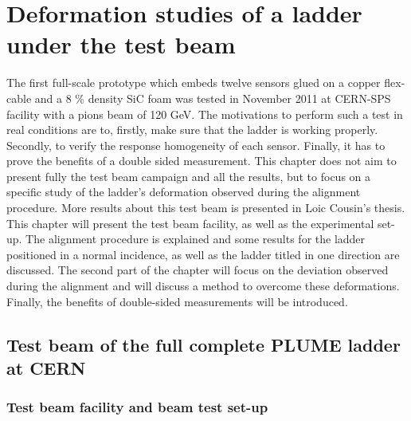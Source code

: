 \chapter{Deformation studies of a ladder under the test beam}

  The first full-scale prototype which embeds twelve sensors glued on a copper flex-cable and a 8 \% density \gls{SiC} foam was tested in November 2011 at CERN-SPS facility with a pions beam of 120 GeV.
  The motivations to perform such a test in real conditions are to, firstly, make sure that the ladder is working properly.
  Secondly, to verify the response homogeneity of each sensor.
  Finally, it has to prove the benefits of a double sided measurement.
  This chapter does not aim to present fully the test beam campaign and all the results, but to focus on a specific study of the ladder's deformation observed during the alignment procedure.
  More results about this test beam is presented in Loic Cousin's thesis\cite{cousin}.
  This chapter will present the test beam facility, as well as the experimental set-up.
  The alignment procedure is explained and some results for the ladder positioned in a normal incidence, as well as the ladder titled in one direction are discussed.
  The second part of the chapter will focus on the deviation observed during the alignment and will discuss a method to overcome these deformations.
  Finally, the benefits of double-sided measurements will be introduced.
  
  \minitoc

  \section{Test beam of the full complete PLUME ladder at CERN}

    \subsection{Test beam facility and beam test set-up}

